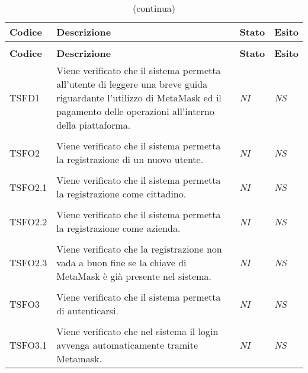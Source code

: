 	\begin{longtable}{ >{\centering}p{} >{}p{}
			>{\centering}p{} >{\centering}p{}}
			
		\caption{Riepilogo Test di Sistema}\\	
		\rowcolorhead
		\textbf{\color{white}Codice} 
		& \centering\textbf{\color{white}Descrizione} 
		& \centering\textbf{\color{white}Stato}
		& \centering\textbf{\color{white}Esito} 
		\tabularnewline %
		\endfirsthead	
		
		\rowcolor{white}\caption[]{(continua)}\\	
		\rowcolorhead
		\textbf{\color{white}Codice} 
		& \centering\textbf{\centering\color{white}Descrizione} 
		& \centering\textbf{\color{white}Stato}
		& \centering\textbf{\color{white}Esito} 
		\tabularnewline %
		\endhead	
		

		\hypertarget{TSFD1}{TSFD1} & Viene verificato che il sistema permetta all'utente 
		di leggere una breve guida riguardante l'utilizzo di MetaMask ed il pagamento 
		delle operazioni all'interno della piattaforma. & \textit{NI} & \textit{NS}\\ 

		\tabularnewline
		\hypertarget{TSFO2}{TSFO2} & Viene verificato che il sistema permetta la 
		registrazione di un nuovo utente. & \textit{NI} & \textit{NS}\\ 

		\tabularnewline
		\hypertarget{TSFO2.1}{TSFO2.1} & Viene verificato che il sistema permetta la 
		registrazione come cittadino. & \textit{NI} & \textit{NS}\\ 

		\tabularnewline
		\hypertarget{TSFO2.2}{TSFO2.2} & Viene verificato che il sistema permetta la 
		registrazione come azienda. & \textit{NI} & \textit{NS}\\ 

		\tabularnewline
		\hypertarget{TSFO2.3}{TSFO2.3} & Viene verificato che la registrazione non vada 
		a buon fine se la chiave di MetaMask è già presente nel sistema. & 
		\textit{NI} & \textit{NS}\\  

		\tabularnewline
		\hypertarget{TSFO3}{TSFO3} & Viene verificato che il sistema permetta di 
		autenticarsi. & \textit{NI} & \textit{NS}\\ 

		\tabularnewline
		\hypertarget{TSFO3.1}{TSFO3.1} & Viene verificato che nel sistema il login 
		avvenga automaticamente tramite Metamask. & \textit{NI} & \textit{NS}\\ 


\end{longtable}
